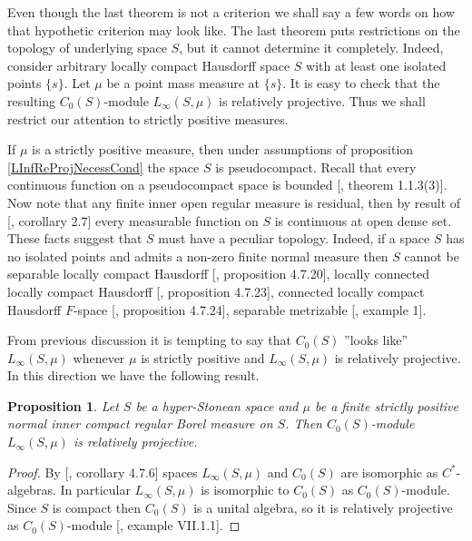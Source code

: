\documentclass[12pt]{article}
\newtheorem{proposition}[theorem]{Proposition}
\begin{document}
Even though the last theorem is not a criterion we shall say a few words on how that hypothetic criterion may look like. The last theorem puts restrictions on the topology of underlying space $S$, but it cannot determine it completely. Indeed, consider arbitrary locally compact Hausdorff space $S$ with at least one isolated points $\{s\}$. Let $\mu$ be a point mass measure at $\{s\}$. It is easy to check that the resulting $C_0(S)$-module $L_\infty(S,\mu)$ is relatively projective. Thus we shall restrict our attention to strictly positive measures.

If $\mu$ is a strictly positive measure, then under assumptions of proposition \ref{LInfReProjNecessCond} the space $S$ is pseudocompact. Recall that every continuous function on a pseudocompact space is bounded [\cite{HrusPseudCompTopSp}, theorem 1.1.3(3)]. Now note that any finite inner open regular measure is residual, then by result of [\cite{ZindResMeasLocCompSp}, corollary 2.7] every measurable function on $S$ is continuous at open dense set. These facts suggest that $S$ must have a peculiar topology. Indeed, if a space $S$ has no isolated points and admits a non-zero finite normal measure then $S$ cannot be separable locally compact Hausdorff [\cite{DalesBanSpContFunDualSp}, proposition 4.7.20], locally connected locally compact Hausdorff [\cite{DalesBanSpContFunDualSp}, proposition 4.7.23], connected locally compact Hausdorff $F$-space [\cite{DalesBanSpContFunDualSp}, proposition 4.7.24], separable metrizable [\cite{FlachNormMeasTopSp}, example 1].

From previous discussion it is tempting to say that $C_0(S)$ ''looks like'' $L_\infty(S,\mu)$ whenever $\mu$ is strictly positive and $L_\infty(S,\mu)$ is relatively projective. In this direction we have the following result.

\begin{proposition}\label{LInfReProjSuffCond} Let $S$ be a hyper-Stonean space and $\mu$ be a finite strictly positive normal inner compact regular Borel measure on $S$. Then $C_0(S)$-module $L_\infty(S,\mu)$ is relatively projective.
\end{proposition}
\begin{proof} By [\cite{DalesBanSpContFunDualSp}, corollary 4.7.6] spaces $L_\infty(S,\mu)$ and $C_0(S)$ are isomorphic as $C^*$-algebras. In particular $L_\infty(S,\mu)$ is isomorphic to $C_0(S)$ as $C_0(S)$-module. Since $S$ is compact then $C_0(S)$ is a unital algebra, so it is relatively projective as $C_0(S)$-module [\cite{HelBanLocConvAlg}, example VII.1.1].
\end{proof}
\end{document}
